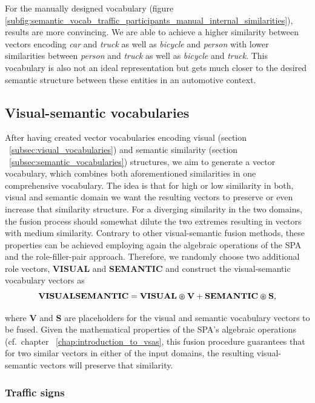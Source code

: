 For the manually designed vocabulary (figure \ref{subfig:semantic_vocab_traffic_participants_manual_internal_similarities}), results are more convincing.
We are able to achieve a higher similarity between vectors encoding \emph{car} and \emph{truck} as well as \emph{bicycle} and \emph{person} with lower similarities between \emph{person} and \emph{truck} as well as \emph{bicycle} and \emph{truck}.
This vocabulary is also not an ideal representation but gets much closer to the desired semantic structure between these entities in an automotive context. 

\subsection{Visual-semantic vocabularies}%
\label{subsec:visual_semantic_vocabularies}
 
After having created vector vocabularies encoding visual (section ~\ref{subsec:visual_vocabularies}) and semantic similarity (section ~\ref{subsec:semantic_vocabularies}) structures, we aim to generate a vector vocabulary, which combines both aforementioned similarities in one comprehensive vocabulary.
The idea is that for high or low similarity in both, visual and semantic domain we want the resulting vectors to preserve or even increase that similarity structure.
For a diverging similarity in the two domains, the fusion process should somewhat dilute the two extremes resulting in vectors with medium similarity.
Contrary to other visual-semantic fusion methods, these properties can be achieved employing again the algebraic operations of the \ac{SPA} and the role-filler-pair approach.
Therefore, we randomly choose two additional role vectors, \textbf{VISUAL} and \textbf{SEMANTIC} and construct the visual-semantic vocabulary vectors as
\begin{equation}
\label{eq:visual_semantic_vocab}
\mathbf{VISUALSEMANTIC} = \mathbf{VISUAL} \varoast \mathbf{V} + \mathbf{SEMANTIC} \varoast \mathbf{S},
\end{equation}

where \textbf{V} and \textbf{S} are placeholders for the visual and semantic vocabulary vectors to be fused.
Given the mathematical properties of the \ac{SPA}'s algebraic operations (cf.\ chapter ~\ref{chap:introduction_to_vsas}, this fusion procedure guarantees that for two similar vectors in either of the input domains, the resulting visual-semantic vectors will preserve that similarity.

\subsubsection{Traffic signs}%
\label{ssubsec:traffic_signs}

